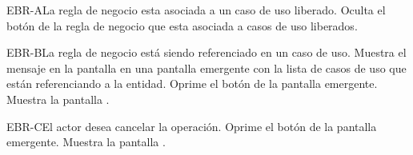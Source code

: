 	\begin{UCtrayectoriaA}{EBR-A}{La regla de negocio esta asociada a un caso de uso liberado.}
		\UCpaso[\UCsist] Oculta el botón \eliminar de la regla de negocio que esta asociada a casos de uso liberados.
	\end{UCtrayectoriaA}

	\begin{UCtrayectoriaA}{EBR-B}{La regla de negocio está siendo referenciado en un caso de uso.}
		\UCpaso[\UCsist] Muestra el mensaje  en la pantalla  en una pantalla emergente con la lista de casos de uso que están referenciando a la entidad.
		\UCpaso[\UCactor] Oprime el botón  de la pantalla emergente.
		\UCpaso[\UCsist] Muestra la pantalla .
	\end{UCtrayectoriaA}

	\begin{UCtrayectoriaA}{EBR-C}{El actor desea cancelar la operación.}
		\UCpaso[\UCactor] Oprime el botón  de la pantalla emergente.
		\UCpaso[\UCsist] Muestra la pantalla .
	\end{UCtrayectoriaA}
	

